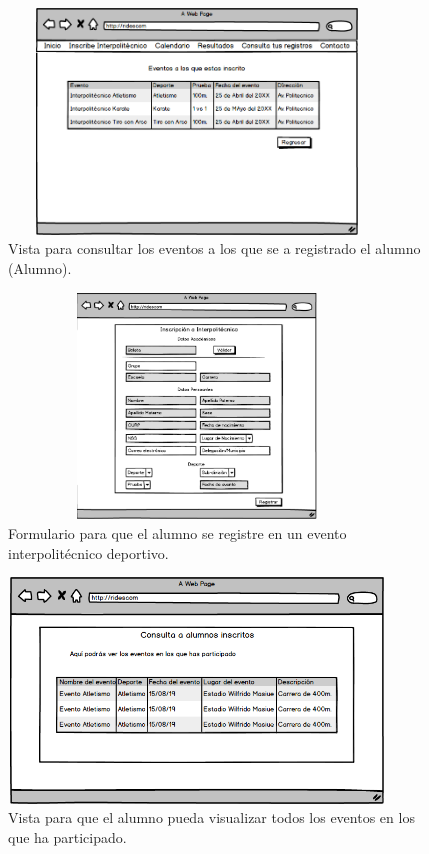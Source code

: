 		\begin{figure} [hbt!]
			\centering
			\includegraphics[width=10cm, height=6cm]{Imagenes/Nuevos/P20_Consulta_Inscripciones}
			\caption{Vista para consultar los eventos a los que se a registrado el alumno (Alumno).}
			\label{consultainscripcion}
		\end{figure}
	\pagebreak
		
		\begin{figure} [hbt!]
			\centering
			\includegraphics[width=10cm, height=6cm]{Imagenes/Disenos/Inscripcioninter}
			\caption{Formulario para que el alumno se registre en un evento interpolitécnico deportivo.}
			\label{Inscripcioninterpolitecnico}
		\end{figure}
		

		\begin{figure} [hbt!]
			\centering
			\includegraphics[width=10cm, height=6cm]{Imagenes/Nuevos/P21_Historial}
			\caption{Vista para que el alumno pueda visualizar todos los eventos en los que ha participado.}
			\label{historial}
		\end{figure}

